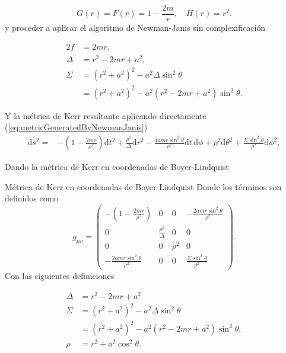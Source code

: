 \begin{equation}
G(r) = F(r) = 1-\frac{2m}{r}, \quad H(r) = r^2.    
\end{equation}
y proceder a aplicar el algoritmo de Newman-Janis sin complexificación

\begin{equation}
\begin{aligned}
    2f &=  2mr,\\
    \Delta &= r^2 - 2mr + a^2,\\
    \Sigma &= \left(r^2+a^2\right)^2-a^2 \Delta \sin ^2 \theta \\
    & =\left(r^2+a^2\right)^2-a^2 (r^2 - 2mr + a^2) \sin ^2 \theta . 
\end{aligned}    
\end{equation}

Y la métrica de Kerr resultante aplicando directamente (\ref{eq:metricGeneratedByNewmanJanis})
    \begin{align}
        \mathrm{d}s^2 = & 
- \left(1 - \frac{2mr}{\rho^2}\right) \mathrm{d}t^2 
+ \frac{\rho^2}{\Delta} \mathrm{d}r^2 
- \frac{4amr \sin^2\theta}{\rho^2} \mathrm{d}t\, \mathrm{d}\phi 
+ \rho^2 \mathrm{d}\theta^2 
+ \frac{\Sigma \sin^2\theta}{\rho^2} \mathrm{d}\phi^2,
    \end{align}

Dando la métrica de Kerr en coordenadas de Boyer-Lindquist

\begin{definition}{Métrica de Kerr en coordenadas de Boyer-Lindquist}{}
Donde los términos son definidos como
\begin{equation}
        g_{\mu \nu}=\left( 
            \begin{array}{cccc}
               -\left(1-\frac{2 mr}{\rho^2}\right) &0&0& - \frac{2amr \sin^2\theta}{\rho^2} \\
               0& \frac{\rho^2}{\Delta} & 0 & 0 \\
                0& 0 & \rho^2 & 0 \\
                -\frac{2amr \sin^2\theta}{\rho^2} & 0 & 0 & \frac{\Sigma \sin^2\theta}{\rho^2}
            \end{array}
        \right).
        \label{eq:covariantKerrMetric}
    \end{equation}
Con las siguientes definiciones

\begin{equation}
    \begin{aligned}
        \Delta &= r^2 - 2mr + a^2\\
    \Sigma &= \left(r^2+a^2\right)^2-a^2 \Delta \sin ^2 \theta  \\
    &=\left(r^2+a^2\right)^2-a^2 (r^2 - 2mr + a^2) \sin ^2 \theta ,\\
    \rho & = r^2+a^2 \cos ^2 \theta.
\end{aligned}
\end{equation}
\end{definition}

